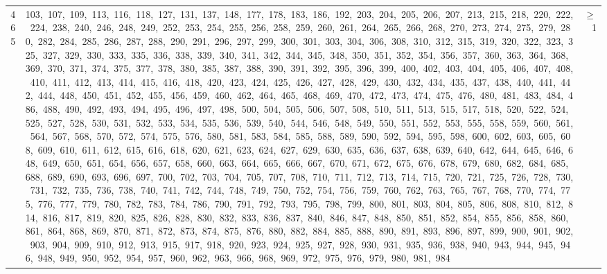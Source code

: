 \begin{longtable}{c|p{}|r}
465 & 103,\ 107,\ 109,\ 113,\ 116,\ 118,\ 127,\ 131,\ 137,\ 148,\ 177,\ 178,\ 183,\ 186,\ 192,\ 203,\ 204,\ 205,\ 206,\ 207,\ 213,\ 215,\ 218,\ 220,\ 222,\ 224,\ 238,\ 240,\ 246,\ 248,\ 249,\ 252,\ 253,\ 254,\ 255,\ 256,\ 258,\ 259,\ 260,\ 261,\ 264,\ 265,\ 266,\ 268,\ 270,\ 273,\ 274,\ 275,\ 279,\ 280,\ 282,\ 284,\ 285,\ 286,\ 287,\ 288,\ 290,\ 291,\ 296,\ 297,\ 299,\ 300,\ 301,\ 303,\ 304,\ 306,\ 308,\ 310,\ 312,\ 315,\ 319,\ 320,\ 322,\ 323,\ 325,\ 327,\ 329,\ 330,\ 333,\ 335,\ 336,\ 338,\ 339,\ 340,\ 341,\ 342,\ 344,\ 345,\ 348,\ 350,\ 351,\ 352,\ 354,\ 356,\ 357,\ 360,\ 363,\ 364,\ 368,\ 369,\ 370,\ 371,\ 374,\ 375,\ 377,\ 378,\ 380,\ 385,\ 387,\ 388,\ 390,\ 391,\ 392,\ 395,\ 396,\ 399,\ 400,\ 402,\ 403,\ 404,\ 405,\ 406,\ 407,\ 408,\ 410,\ 411,\ 412,\ 413,\ 414,\ 415,\ 416,\ 418,\ 420,\ 423,\ 424,\ 425,\ 426,\ 427,\ 428,\ 429,\ 430,\ 432,\ 434,\ 435,\ 437,\ 438,\ 440,\ 441,\ 442,\ 444,\ 448,\ 450,\ 451,\ 452,\ 455,\ 456,\ 459,\ 460,\ 462,\ 464,\ 465,\ 468,\ 469,\ 470,\ 472,\ 473,\ 474,\ 475,\ 476,\ 480,\ 481,\ 483,\ 484,\ 486,\ 488,\ 490,\ 492,\ 493,\ 494,\ 495,\ 496,\ 497,\ 498,\ 500,\ 504,\ 505,\ 506,\ 507,\ 508,\ 510,\ 511,\ 513,\ 515,\ 517,\ 518,\ 520,\ 522,\ 524,\ 525,\ 527,\ 528,\ 530,\ 531,\ 532,\ 533,\ 534,\ 535,\ 536,\ 539,\ 540,\ 544,\ 546,\ 548,\ 549,\ 550,\ 551,\ 552,\ 553,\ 555,\ 558,\ 559,\ 560,\ 561,\ 564,\ 567,\ 568,\ 570,\ 572,\ 574,\ 575,\ 576,\ 580,\ 581,\ 583,\ 584,\ 585,\ 588,\ 589,\ 590,\ 592,\ 594,\ 595,\ 598,\ 600,\ 602,\ 603,\ 605,\ 608,\ 609,\ 610,\ 611,\ 612,\ 615,\ 616,\ 618,\ 620,\ 621,\ 623,\ 624,\ 627,\ 629,\ 630,\ 635,\ 636,\ 637,\ 638,\ 639,\ 640,\ 642,\ 644,\ 645,\ 646,\ 648,\ 649,\ 650,\ 651,\ 654,\ 656,\ 657,\ 658,\ 660,\ 663,\ 664,\ 665,\ 666,\ 667,\ 670,\ 671,\ 672,\ 675,\ 676,\ 678,\ 679,\ 680,\ 682,\ 684,\ 685,\ 688,\ 689,\ 690,\ 693,\ 696,\ 697,\ 700,\ 702,\ 703,\ 704,\ 705,\ 707,\ 708,\ 710,\ 711,\ 712,\ 713,\ 714,\ 715,\ 720,\ 721,\ 725,\ 726,\ 728,\ 730,\ 731,\ 732,\ 735,\ 736,\ 738,\ 740,\ 741,\ 742,\ 744,\ 748,\ 749,\ 750,\ 752,\ 754,\ 756,\ 759,\ 760,\ 762,\ 763,\ 765,\ 767,\ 768,\ 770,\ 774,\ 775,\ 776,\ 777,\ 779,\ 780,\ 782,\ 783,\ 784,\ 786,\ 790,\ 791,\ 792,\ 793,\ 795,\ 798,\ 799,\ 800,\ 801,\ 803,\ 804,\ 805,\ 806,\ 808,\ 810,\ 812,\ 814,\ 816,\ 817,\ 819,\ 820,\ 825,\ 826,\ 828,\ 830,\ 832,\ 833,\ 836,\ 837,\ 840,\ 846,\ 847,\ 848,\ 850,\ 851,\ 852,\ 854,\ 855,\ 856,\ 858,\ 860,\ 861,\ 864,\ 868,\ 869,\ 870,\ 871,\ 872,\ 873,\ 874,\ 875,\ 876,\ 880,\ 882,\ 884,\ 885,\ 888,\ 890,\ 891,\ 893,\ 896,\ 897,\ 899,\ 900,\ 901,\ 902,\ 903,\ 904,\ 909,\ 910,\ 912,\ 913,\ 915,\ 917,\ 918,\ 920,\ 923,\ 924,\ 925,\ 927,\ 928,\ 930,\ 931,\ 935,\ 936,\ 938,\ 940,\ 943,\ 944,\ 945,\ 946,\ 948,\ 949,\ 950,\ 952,\ 954,\ 957,\ 960,\ 962,\ 963,\ 966,\ 968,\ 969,\ 972,\ 975,\ 976,\ 979,\ 980,\ 981,\ 984 & $\ge$ 1 \\

\end{longtable}
